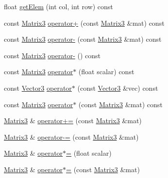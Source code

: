 \begin{DoxyCompactItemize}
float \hyperlink{classVectormath_1_1Aos_1_1Matrix3_a8cf1be2713a605389a3273733529bcfb}{get\-Elem} (int col, int row) const 
\item 
const \hyperlink{classVectormath_1_1Aos_1_1Matrix3}{Matrix3} \hyperlink{classVectormath_1_1Aos_1_1Matrix3_a2e7abedeb50d67f4fb95036d48f6d74a}{operator+} (const \hyperlink{classVectormath_1_1Aos_1_1Matrix3}{Matrix3} \&mat) const 
\item 
const \hyperlink{classVectormath_1_1Aos_1_1Matrix3}{Matrix3} \hyperlink{classVectormath_1_1Aos_1_1Matrix3_a33d3682577d86b26bbbfd246a387f336}{operator-\/} (const \hyperlink{classVectormath_1_1Aos_1_1Matrix3}{Matrix3} \&mat) const 
\item 
const \hyperlink{classVectormath_1_1Aos_1_1Matrix3}{Matrix3} \hyperlink{classVectormath_1_1Aos_1_1Matrix3_a53785eb1e061c5399e9b5a1881f730b1}{operator-\/} () const 
\item 
const \hyperlink{classVectormath_1_1Aos_1_1Matrix3}{Matrix3} \hyperlink{classVectormath_1_1Aos_1_1Matrix3_abadab46b70f4a9304d154ffed1e2ec88}{operator$\ast$} (float scalar) const 
\item 
const \hyperlink{classVectormath_1_1Aos_1_1Vector3}{Vector3} \hyperlink{classVectormath_1_1Aos_1_1Matrix3_a347c75aec0823415a23e4bacc6ee8831}{operator$\ast$} (const \hyperlink{classVectormath_1_1Aos_1_1Vector3}{Vector3} \&vec) const 
\item 
const \hyperlink{classVectormath_1_1Aos_1_1Matrix3}{Matrix3} \hyperlink{classVectormath_1_1Aos_1_1Matrix3_a3bca561d08a78f979fc678d1bd27c18f}{operator$\ast$} (const \hyperlink{classVectormath_1_1Aos_1_1Matrix3}{Matrix3} \&mat) const 
\item 
\hyperlink{classVectormath_1_1Aos_1_1Matrix3}{Matrix3} \& \hyperlink{classVectormath_1_1Aos_1_1Matrix3_ad9c0b388a8f50f169e11323e57910594}{operator+=} (const \hyperlink{classVectormath_1_1Aos_1_1Matrix3}{Matrix3} \&mat)
\item 
\hyperlink{classVectormath_1_1Aos_1_1Matrix3}{Matrix3} \& \hyperlink{classVectormath_1_1Aos_1_1Matrix3_a0de016c1b9b7b193d16060ac65a4403f}{operator-\/=} (const \hyperlink{classVectormath_1_1Aos_1_1Matrix3}{Matrix3} \&mat)
\item 
\hyperlink{classVectormath_1_1Aos_1_1Matrix3}{Matrix3} \& \hyperlink{classVectormath_1_1Aos_1_1Matrix3_ade7fbbfd06fb807221d441cd868a467b}{operator$\ast$=} (float scalar)
\item 
\hyperlink{classVectormath_1_1Aos_1_1Matrix3}{Matrix3} \& \hyperlink{classVectormath_1_1Aos_1_1Matrix3_a587c3f3146429ecb9a12df342dfa6196}{operator$\ast$=} (const \hyperlink{classVectormath_1_1Aos_1_1Matrix3}{Matrix3} \&mat)
\end{DoxyCompactItemize}
